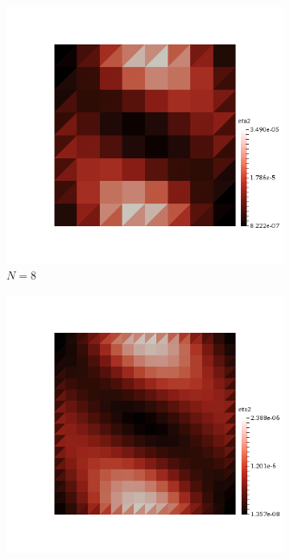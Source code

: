 \clearpage

\begin{figure}[h!]
  \centering
  \begin{subfigure}[b]{0.24\textwidth}
    \includegraphics[width=\textwidth,height=\textheight,keepaspectratio,height=\textheight,keepaspectratio]{figures/2_mpet/biomedical/space/eta2_8.png}
    \caption{$N=8$}
  \end{subfigure}
  \begin{subfigure}[b]{0.24\textwidth}
    \includegraphics[width=\textwidth,height=\textheight,keepaspectratio,height=\textheight,keepaspectratio]{figures/2_mpet/biomedical/space/eta2_16.png}

\end{subfigure}
\end{figure}
